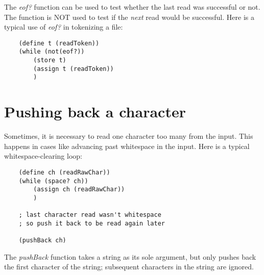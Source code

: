 The {\it eof?} function can be used to test whether the last
read was successful or not. The function is NOT used to
test if the {\it next} read would be successful. Here is a typical
use of {\it eof?} in tokenizing a file:

\begin{verbatim}
    (define t (readToken))
    (while (not(eof?))
        (store t)
        (assign t (readToken))
        )
\end{verbatim}

\section{Pushing back a character}

Sometimes, it is necessary to read one character too
many from the input. This happens in cases like
advancing past whitespace in the input.
Here is a typical whitespace-clearing loop:

\begin{verbatim}
    (define ch (readRawChar))
    (while (space? ch))
        (assign ch (readRawChar))
        )

    ; last character read wasn't whitespace
    ; so push it back to be read again later

    (pushBack ch)
\end{verbatim}

The {\it pushBack} function takes a string as its
sole argument, but only pushes back the first
character of the string; subsequent characters in
the string are ignored.
